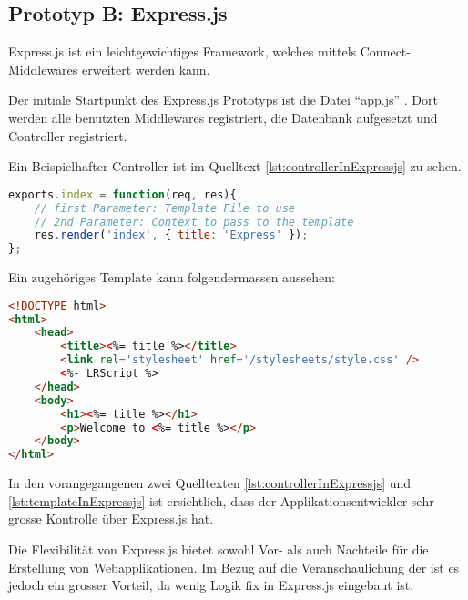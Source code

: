 \subsection{Prototyp B: Express.js}

Express.js \cite{Expressjs} ist ein leichtgewichtiges Framework, welches mittels Connect-Middlewares \cite{connect} erweitert werden kann.

Der initiale Startpunkt des Express.js Prototyps ist die Datei ``app.js'' \cite{ExpressjsPrototypAppjs}. Dort werden alle benutzten Middlewares registriert, die Datenbank aufgesetzt und Controller registriert.

Ein Beispielhafter Controller ist im Quelltext \ref{lst:controllerInExpressjs} zu sehen.

\begin{lstlisting}[language=JavaScript, caption=Beispiel eines Controllers in Express.js, label=lst:controllerInExpressjs]
exports.index = function(req, res){
	// first Parameter: Template File to use
	// 2nd Parameter: Context to pass to the template
	res.render('index', { title: 'Express' });
};
\end{lstlisting}

Ein zugehöriges Template kann folgendermassen aussehen:

\begin{lstlisting}[language=HTML, caption=Template in Express.js, label=lst:templateInExpressjs]
<!DOCTYPE html>
<html>
	<head>
		<title><%= title %></title>
		<link rel='stylesheet' href='/stylesheets/style.css' />
		<%- LRScript %>
	</head>
	<body>
		<h1><%= title %></h1>
		<p>Welcome to <%= title %></p>
	</body>
</html>
\end{lstlisting}

In den vorangegangenen zwei Quelltexten \ref{lst:controllerInExpressjs} und \ref{lst:templateInExpressjs} ist ersichtlich, dass der Applikationsentwickler sehr grosse Kontrolle über Express.js hat.

Die Flexibilität von Express.js bietet sowohl Vor- als auch Nachteile für die Erstellung von Webapplikationen. Im Bezug auf die Veranschaulichung der  ist es jedoch ein grosser Vorteil, da wenig Logik fix in Express.js eingebaut ist.